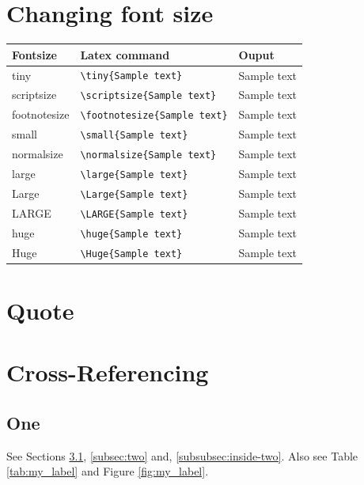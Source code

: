 \documentclass[12pt,twoside,a4paper]{article}
\begin{document}
\section{Changing font size}
\begin{tabular}{| l | l | l |}
\toprule
\textbf{Fontsize}  &  \textbf{Latex command}  &  \textbf{Ouput} \\
\midrule
tiny          &  \verb|\tiny{Sample text}|          &  \tiny{Sample text} \\
scriptsize    &  \verb|\scriptsize{Sample text}|    &  \scriptsize{Sample text} \\
footnotesize  &  \verb|\footnotesize{Sample text}|  &  \footnotesize{Sample text} \\
small         &  \verb|\small{Sample text}|         &  \small{Sample text} \\
normalsize    &  \verb|\normalsize{Sample text}|    &  \normalsize{Sample text} \\
large         &  \verb|\large{Sample text}|         &  \large{Sample text} \\
Large         &  \verb|\Large{Sample text}|         &  \Large{Sample text} \\
LARGE         &  \verb|\LARGE{Sample text}|         &  \LARGE{Sample text} \\
huge          &  \verb|\huge{Sample text}|          &  \huge{Sample text} \\
Huge          &  \verb|\Huge{Sample text}|          &  \Huge{Sample text} \\
\bottomrule
\end{tabular}





\section{Quote}
\blindtext[1]
\begin{quote}
	\blindmathtrue
	\blindtext[1]
\end{quote}
\blindtext[1]



\section{Cross-Referencing}

\subsection{One}
\label{subsec:one}
See Sections \ref{subsec:one}, \ref{subsec:two} and, \ref{subsubsec:inside-two}. Also see Table \ref{tab:my_label} and Figure \ref{fig:my_label}.
\end{document}
